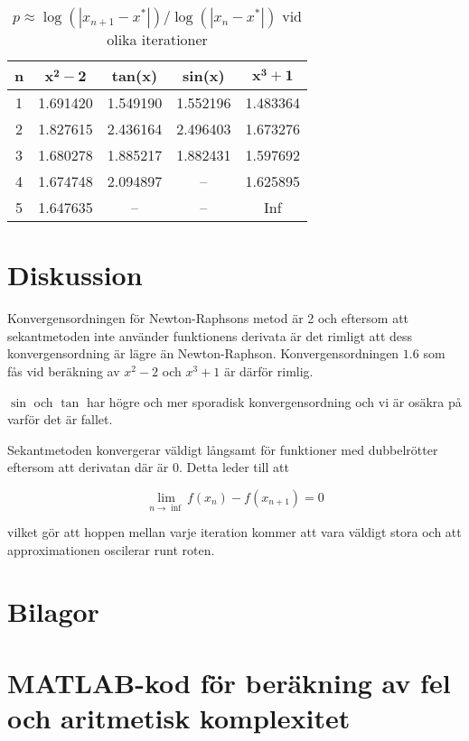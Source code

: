 \documentclass[a4paper,titlepage]{article}
\begin{document}
\begin{table}[h]
    \centering
    \begin{tabular}{c | c | c | c | c}
        \textbf{n} & $\mathbf{x^2 - 2}$ & \textbf{tan(x)} & \textbf{sin(x)} & $\mathbf{x^3 + 1}$ \\ \hline
        1 & 1.691420 & 1.549190 & 1.552196 & 1.483364 \\
        2 & 1.827615 & 2.436164 & 2.496403 & 1.673276 \\
        3 & 1.680278 & 1.885217 & 1.882431 & 1.597692 \\
        4 & 1.674748 & 2.094897 & --       & 1.625895 \\
        5 & 1.647635 & --       & --       & Inf \\
        
    \end{tabular}
    \label{tab:ps}
    \caption{$p \approx \log(|x_{n + 1} - x^*|)/\log(|x_n - x^*|)$ vid olika iterationer}
\end{table}

\section{Diskussion}

Konvergensordningen för Newton-Raphsons metod är 2 och eftersom att sekantmetoden
inte använder funktionens derivata är det rimligt att dess konvergensordning är lägre
än Newton-Raphson. Konvergensordningen $1.6$ som fås vid beräkning av $x^2-2$ och
$x^3 + 1$ är därför rimlig.

$\sin$ och $\tan$ har högre och mer sporadisk konvergensordning och vi är osäkra på varför
det är fallet.

Sekantmetoden konvergerar väldigt långsamt för funktioner med dubbelrötter eftersom
att derivatan där är 0. Detta leder till att

\[
    \lim_{n \to \inf} f(x_n) - f(x_{n+1}) = 0
\]

vilket gör att hoppen mellan varje iteration kommer att vara väldigt stora och att
approximationen oscilerar runt roten.

\section*{Bilagor}
\appendix

\section{MATLAB-kod för beräkning av fel och aritmetisk komplexitet}
\label{sec:testcode}


\end{document}
